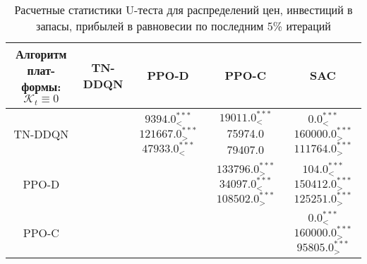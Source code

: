 \bgroup
\def\arraystretch{1.25}
\begin{table}[H]
	\caption{Расчетные статистики U-теста для распределений цен, инвестиций в запасы, прибылей в равновесии по последним 5\% итераций}
	\label{tables:ks_None:p_y_pi}
	\begin{center}
		\vspace{-0.5em}
		\begin{tabular}{c||cccc}
			\toprule
			\makecell{Алгоритм плат-\\ формы: $\mathcal{K}_t \equiv 0$} & TN-DDQN & PPO-D & PPO-C & SAC \\
			\midrule
			TN-DDQN & \makecell[c]{ \\[1ex] } & \makecell[c]{ $9394.0^{***}_{<} $\\$121667.0^{***}_{>} $\\$47933.0^{***}_{<} $\\[1ex] } & \makecell[c]{ $19011.0^{***}_{<} $\\75974.0\\79407.0\\[1ex] } & \makecell[c]{ $0.0^{***}_{<} $\\$160000.0^{***}_{>} $\\$111764.0^{***}_{>} $\\[1ex] } \\
			PPO-D & \makecell[c]{ \\[1ex] } & \makecell[c]{ \\[1ex] } & \makecell[c]{ $133796.0^{***}_{>} $\\$34097.0^{***}_{<} $\\$108502.0^{***}_{>} $\\[1ex] } & \makecell[c]{ $104.0^{***}_{<} $\\$150412.0^{***}_{>} $\\$125251.0^{***}_{>} $\\[1ex] } \\
			PPO-C & \makecell[c]{ \\[1ex] } & \makecell[c]{ \\[1ex] } & \makecell[c]{ \\[1ex] } & \makecell[c]{ $0.0^{***}_{<} $\\$160000.0^{***}_{>} $\\$95805.0^{***}_{>} $\\[1ex] } \\
			\bottomrule
		\end{tabular}
	\end{center}
\end{table}
\egroup